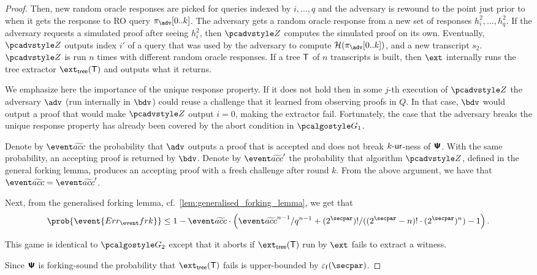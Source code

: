 \begin{proof}
		Then, new random oracle responses are picked for queries indexed by
		$i, \ldots, q$ and the adversary is rewound to the point just prior to when it gets the
		response to RO query $\zkproof_{\advse}[0..k]$. The adversary gets a random
		oracle response from a new set of responses $h^2_i, \ldots, h^2_q$. If the
		adversary requests a simulated proof after seeing $h^2_i$, then $\zdv$ computes
		the simulated proof on its own. Eventually, $\zdv$ outputs index $i'$ of a query
		that was used by the adversary to compute $\ro(\zkproof_{\advse}[0..k])$, and a
		new transcript $s_2$. $\zdv$ is run $n$ times with different random oracle
		responses. If a tree $\mathsf{T}$ of $n$ transcripts is built, then $\ext$
		internally runs the tree extractor $\extt(\tree)$ and outputs what it returns.
		
		We emphasize here the importance of the unique response property. If it does not hold then in
		some $j$-th execution of $\zdv$ the adversary $\adv$ (run internally in $\bdv$) could reuse a
		challenge that it learned from observing proofs in $Q$. In that case, $\bdv$ would output a
		proof that would make $\zdv$ output $i = 0$, making the extractor fail. Fortunately, the case
		that the adversary breaks the unique response property has already been covered by the abort
		condition in $\game{1}$.
		
		Denote by $\waccProb$ the probability that $\advse$ outputs a proof that is accepted and does
		not break ${k\text{-}\mathsf{ur}}$-ness of $\bm{\mathsf{\Psi}}$. With the same probability, an accepting proof is returned by
		$\bdv$. Denote by $\waccProb'$ the probability that algorithm $\zdv$, defined in the general forking lemma,
		produces an accepting proof with a fresh challenge after round $k$. From the above argument,
		we have that $\waccProb = \waccProb'$.
		
		Next, from the generalised forking lemma, cf.~\cref{lem:generalised_forking_lemma}, we get that
		\begin{equation}
		\begin{split}
		\prob{\event{\errfrk}} \leq 1 - \waccProb \cdot \left(\infrac{\waccProb^{n -
				1}}{q^{n - 1}} + \infrac{(2^\secpar) !}{((2^\secpar - n)! \cdot
			(2^\secpar)^{n})} - 1\right).
		\end{split}
		\end{equation}
	
		This game is identical to $\game{2}$ except that it aborts if
		$\extt(\tree)$ run by $\ext$ fails to extract a witness. 
	
		Since $\bm{\mathsf{\Psi}}$ is forking-sound the probability that $\extt(\tree)$
		fails is upper-bounded by $\epsss(\secpar)$.
		

\end{proof}
